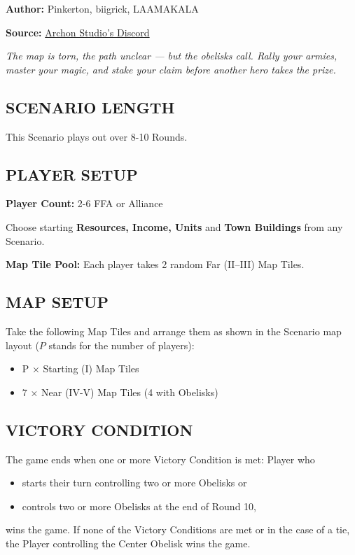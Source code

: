 
\begin{multicols*}{2}

\textbf{Author:} Pinkerton, biigrick, LAAMAKALA

\textbf{Source:} \href{https://discord.com/channels/740870068178649108/1232319328049954826}{Archon Studio's Discord}

\textit{The map is torn, the path unclear — but the obelisks call. Rally your armies, master your magic, and stake your claim before another hero takes the prize.}  %

\subsection*{\MakeUppercase{Scenario Length}}
This Scenario plays out over 8-10 Rounds.

\subsection*{\MakeUppercase{Player Setup}}
\textbf{Player Count:} 2-6 FFA or Alliance

Choose starting \textbf{Resources, Income, Units} and \textbf{Town Buildings} from any Scenario.

\textbf{Map Tile Pool:} Each player takes 2 random Far (II--III) Map Tiles.

\subsection*{\MakeUppercase{Map Setup}}
Take the following Map Tiles and arrange them as shown in the Scenario map layout ($P$ stands for the number of players):

\begin{itemize}
  \item P × Starting (I) Map Tiles
  \item 7 × Near (IV-V) Map Tiles (4 with Obelisks)
\end{itemize}

\subsection*{\MakeUppercase{Victory Condition}}
The game ends when one or more Victory Condition is met: Player who
\begin{itemize}
  \item starts their turn controlling two or more Obelisks or
  \item controls two or more Obelisks at the end of Round 10,
\end{itemize}
wins the game. If none of the Victory Conditions are met or in the case of a tie, the Player controlling the Center Obelisk wins the game.


\end{multicols*}

